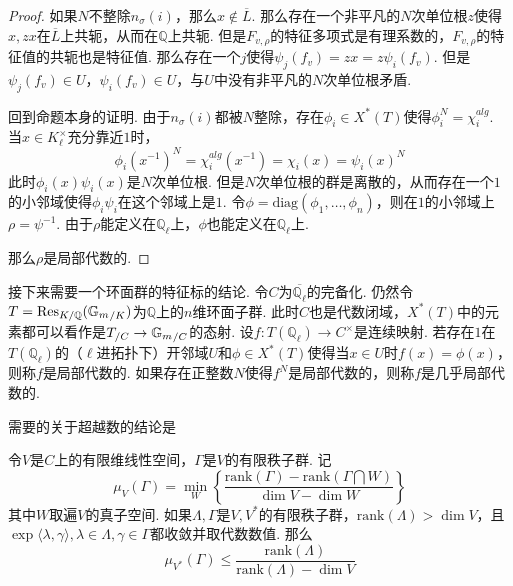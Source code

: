 \begin{proof}
    如果$N$不整除$n_{\sigma}(i)$，那么$x\not\in \overline{L}$. 那么存在一个非平凡的$N$次单位根$z$使得$x, zx$在$\overline{L}$上共轭，从而在$\mathbb{Q}$上共轭. 但是$F_{v,\rho}$的特征多项式是有理系数的，$F_{v,\rho}$的特征值的共轭也是特征值. 那么存在一个$j$使得$\psi_j(f_v) = zx = z\psi_i(f_v)$. 但是$\psi_j(f_v)\in U$，$\psi_i(f_v)\in U$，与$U$中没有非平凡的$N$次单位根矛盾.

    \vskip0.3cm

    回到命题本身的证明. 由于$n_{\sigma}(i)$都被$N$整除，存在$\phi_i\in X^{*}(T)$使得$\phi_i^N = \chi_i^{alg}$. 当$x\in K_{\ell}^{\times}$充分靠近$1$时，
    \begin{equation}
        \phi_i(x^{-1})^N = \chi_i^{alg}(x^{-1}) = \chi_i(x) = \psi_i(x)^N
    \end{equation}
    此时$\phi_i(x)\psi_i(x)$是$N$次单位根. 但是$N$次单位根的群是离散的，从而存在一个$1$的小邻域使得$\phi_i\psi_i$在这个邻域上是$1$. 令$\phi=\mathrm{diag}(\phi_1,\ldots,\phi_n)$，则在$1$的小邻域上$\rho = \psi^{-1}$. 由于$\rho$能定义在$\mathbb{Q}_{\ell}$上，$\phi$也能定义在$\mathbb{Q}_{\ell}$上.

    那么$\rho$是局部代数的.
\end{proof}

接下来需要一个环面群的特征标的结论.
令$C$为$\overline{\mathbb{Q}_{\ell}}$的完备化. 仍然令$T=\mathrm{Res}_{K/\mathbb{Q}}({\mathbb{G}_m}_{/K})$为$\mathbb{Q}$上的$n$维环面子群. 此时$C$也是代数闭域，$X^{*}(T)$中的元素都可以看作是${T}_{/C}\to {\mathbb{G}_m}_{/C}$的态射.
设$f: T(\mathbb{Q}_{\ell})\to C^{\times}$是连续映射. 若存在$1$在$T(\mathbb{Q}_{\ell})$的（$\ell$进拓扑下）开邻域$U$和$\phi\in X^{*}(T)$使得当$x\in U$时$f(x)=\phi(x)$，则称$f$是局部代数的. 如果存在正整数$N$使得$f^N$是局部代数的，则称$f$是几乎局部代数的.

需要的关于超越数的结论是
\begin{cprop}
    令$V$是$C$上的有限维线性空间，$\Gamma$是$V$的有限秩子群. 记
    \begin{equation}
        \mu_{V}(\Gamma) = \min_W \left\{ \frac{\mathrm{rank}(\Gamma) - \mathrm{rank}(\Gamma \bigcap W)}{\dim V-\dim W} \right\}
    \end{equation}
    其中$W$取遍$V$的真子空间. 如果$\Lambda, \Gamma$是$V, V^{*}$的有限秩子群，$\mathrm{rank}(\Lambda)>\dim V$，且$\exp\langle \lambda, \gamma\rangle, \lambda \in \Lambda, \gamma\in \Gamma$都收敛并取代数数值. 那么
    \begin{equation}
        \mu_{V^{*}}(\Gamma)\leq \frac{\mathrm{rank}(\Lambda)}{\mathrm{rank}(\Lambda) - \dim V}
    \end{equation}\label{temp::theo8}
\end{cprop}

